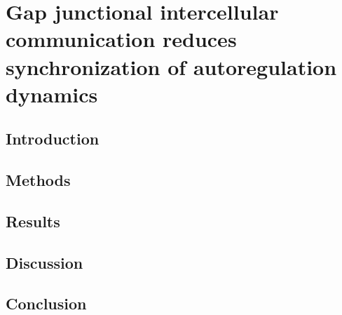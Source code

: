 \chapter{Gap junctional intercellular communication reduces synchronization of autoregulation dynamics}

\section{Introduction}

\section{Methods}

\section{Results}

\section{Discussion}

\section{Conclusion}
